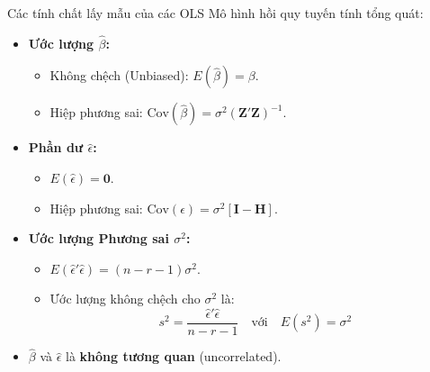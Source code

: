 \begin{frame}{Các tính chất lấy mẫu của các OLS}
    Mô hình hồi quy tuyến tính tổng quát:
    \begin{itemize}
        \item \textbf{Ước lượng $\hat{\beta}$:}
        \begin{itemize}
            \item Không chệch (Unbiased): $E(\hat{\beta}) = \beta$.
            \item Hiệp phương sai: $\text{Cov}(\hat{\beta}) = \sigma^2(\mathbf{Z}'\mathbf{Z})^{-1}$.
        \end{itemize}
        \bigskip
        \item \textbf{Phần dư $\hat{\epsilon}$:}
        \begin{itemize}
            \item $E(\hat{\epsilon}) = \mathbf{0}$.
            \item Hiệp phương sai: $\text{Cov}(\hat{\epsilon}) = \sigma^2[\mathbf{I} - \mathbf{H}]$.
        \end{itemize}
        \bigskip
        \item \textbf{Ước lượng Phương sai $\sigma^2$:}
        \begin{itemize}
            \item $E(\hat{\epsilon}'\hat{\epsilon}) = (n-r-1)\sigma^2$.
            \item Ước lượng không chệch cho $\sigma^2$ là:
            \[
            s^2 = \frac{\hat{\epsilon}'\hat{\epsilon}}{n-r-1} \quad \text{với} \quad E(s^2) = \sigma^2
            \]
            
        \end{itemize}
        \bigskip
        \item $\hat{\beta}$ và $\hat{\epsilon}$ là \textbf{không tương quan} (uncorrelated).
    \end{itemize}
\end{frame}

